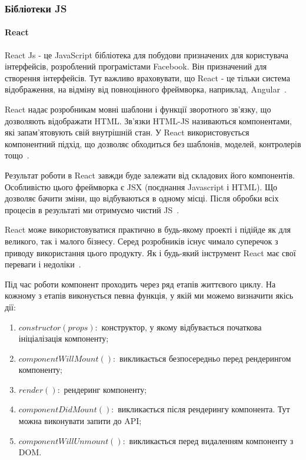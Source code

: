 \subsubsection{Бібліотеки JS}

\paragraph{React}

React Js - це JavaScript бібліотека для побудови призначених для користувача інтерфейсів, розроблений програмістами Facebook. Він призначений для створення інтерфейсів. Тут важливо враховувати, що React - це тільки система відображення, на відміну від повноцінного фреймворка, наприклад, Angular~\cite{fedosejev2015react}.

React надає розробникам мовні шаблони і функції зворотного зв'язку, що дозволяють відображати HTML. Зв'язки HTML-JS називаються компонентами, які запам'ятовують свій внутрішній стан. У React використовується компонентний підхід, що дозволяє обходиться без шаблонів, моделей, контролерів тощо~\cite{sagarganatra2018}.

Результат роботи в React завжди буде залежати від складових його компонентів. Особливістю цього фреймворка є JSX (поєднання Javascript і HTML). Що дозволяє бачити зміни, що відбуваються в одному місці. Після обробки всіх процесів в результаті ми отримуємо чистий JS~\cite{js.next:ecmascript6}.


React може використовуватися практично в будь-якому проекті і підійде як для великого, так і малого бізнесу. Серед розробників існує чимало суперечок з приводу використання цього продукту. Як і будь-який інструмент React має свої переваги і недоліки~\cite{caspers2017react}.

Під час роботи компонент проходить через ряд етапів життєвого циклу. На кожному з етапів виконується певна функція, у якій ми можемо визначити якісь дії:

\begin{enumerate}
    \item $constructor(props):$ конструктор, у якому відбувається початкова ініціалізація компоненту;
    \item $componentWillMount():$ викликається безпосередньо перед рендерингом компоненту;
    \item $render():$ рендеринг компоненту;
    \item $componentDidMount():$ викликається після рендерингу компонента. Тут можна виконувати запити до API;
    \item $componentWillUnmount():$ викликається перед видаленням компоненту з DOM.
\end{enumerate}

